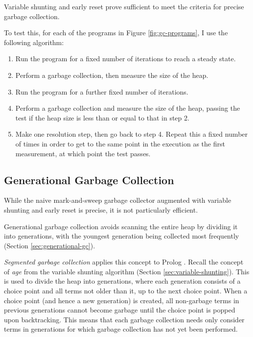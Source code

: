 Variable shunting and early reset prove sufficient to meet the criteria for precise garbage collection.

To test this, for each of the programs in Figure \ref{fig:gc-programs}, I use the following algorithm:

\begin{enumerate}
\item Run the program for a fixed number of iterations to reach a steady state.
\item Perform a garbage collection, then measure the size of the heap.
\item Run the program for a further fixed number of iterations.
\item Perform a garbage collection and measure the size of the heap, passing the test if the heap size is less than or equal to that in step 2.
\item Make one resolution step, then go back to step 4. Repeat this a fixed number of times in order to get to the same point in the execution as the first measurement, at which point the test passes.
\end{enumerate}

\subsection{Generational Garbage Collection}

\label{sec:implementation-generational-gc}

While the naive mark-and-sweep garbage collector augmented with variable shunting and early reset is precise, it is not particularly efficient.

Generational garbage collection avoids scanning the entire heap by dividing it into generations, with the youngest generation being collected most frequently (Section \ref{sec:generational-gc}).

\emph{Segmented garbage collection} applies this concept to Prolog \cite{applebyGarbargecollectionProlog1988}. Recall the concept of \emph{age} from the variable shunting algorithm (Section \ref{sec:variable-shunting}). This is used to divide the heap into generations, where each generation consists of a choice point and all terms not older than it, up to the next choice point. When a choice point (and hence a new generation) is created, all non-garbage terms in previous generations cannot become garbage until the choice point is popped upon backtracking. This means that each garbage collection needs only consider terms in generations for which garbage collection has not yet been performed.


